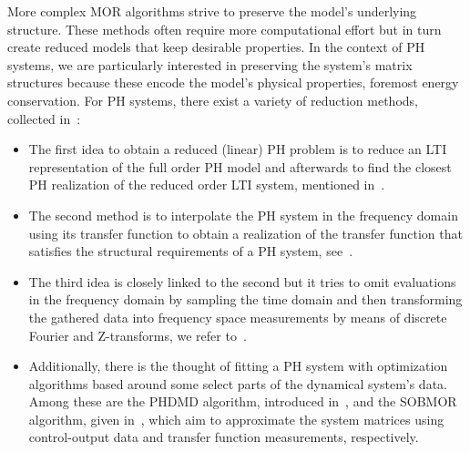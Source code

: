 More complex MOR algorithms strive to preserve the model's underlying structure.
These methods often require more computational effort but in turn create reduced models that keep desirable properties.
In the context of \ac{PH} systems, we are particularly interested in preserving the system's matrix structures because these encode the model's physical properties, foremost energy conservation.
For \ac{PH} systems, there exist a variety of reduction methods, collected in~\cite{Polyuga2010}:
\begin{itemize}
    \item The first idea to obtain a reduced (linear) \ac{PH} problem is to reduce an \ac{LTI} representation of the full order \ac{PH} model and afterwards to find the closest \ac{PH} realization of the reduced order \ac{LTI} system, mentioned in~\cite{Gillis2018, Cherifi2019}.
    \item The second method is to interpolate the \ac{PH} system in the frequency domain using its transfer function to obtain a realization of the transfer function that satisfies the structural requirements of a \ac{PH} system, see~\cite{BGD2020, Schwerdtner2021, Poussot2023}.
    \item The third idea is closely linked to the second but it tries to omit evaluations in the frequency domain by sampling the time domain and then transforming the gathered data into frequency space measurements by means of discrete Fourier and Z-transforms, we refer to~\cite{Najnudel2021, Cherifi2022, Günther2023}.
    \item Additionally, there is the thought of fitting a \ac{PH} system with optimization algorithms based around some select parts of the dynamical system's data.
        Among these are the \ac{PHDMD} algorithm, introduced in~\cite{Morandin2023}, and the SOBMOR algorithm, given in~\cite{SV2023}, which aim to approximate the system matrices using control-output data and transfer function measurements, respectively.
\end{itemize}

